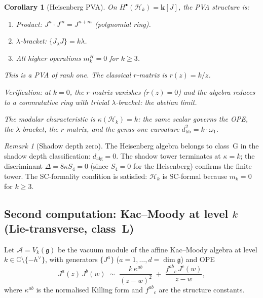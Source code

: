 \documentclass[11pt,reqno]{amsart}
\newtheorem{corollary}[theorem]{Corollary}
\theoremstyle{definition}
\theoremstyle{remark}
\newtheorem{remark}[theorem]{Remark}
\newcommand{\cA}{\mathcal{A}}
\newcommand{\cH}{\mathcal{H}}
\newcommand{\CC}{\mathbb{C}}
\providecommand{\Bbbk}{\mathbf{k}}
\newcommand{\fg}{\mathfrak{g}}
\numberwithin{equation}{section}
\begin{document}
\begin{corollary}[Heisenberg PVA]
\label{cor:heisenberg-pva}
On $H^\bullet(\cH_k) = \Bbbk[J]$, the PVA structure is:
\begin{enumerate}[label=(\roman*)]
\item Product: $J^n \cdot J^m = J^{n+m}$ (polynomial ring).
\item $\lambda$-bracket: $\{J_\lambda J\} = k\lambda$.
\item All higher operations $m_k^H = 0$ for $k \geq 3$.
\end{enumerate}
This is a PVA of rank one.  The classical $r$-matrix is
$r(z) = k/z$.

Verification: at $k = 0$, the $r$-matrix vanishes ($r(z) = 0$)
and the algebra reduces to a commutative ring with trivial
$\lambda$-bracket: the abelian limit.

The modular characteristic is $\kappa(\cH_k) = k$: the same
scalar governs the OPE, the $\lambda$-bracket, the $r$-matrix,
and the genus-one curvature $d_{\mathrm{fib}}^2 = k \cdot \omega_1$.
\end{corollary}

\begin{remark}[Shadow depth zero]
\label{rem:heisenberg-shadow}
The Heisenberg algebra belongs to class~G in the shadow depth
classification: $d_{\mathrm{alg}} = 0$.  The shadow tower
terminates at $\kappa = k$; the discriminant
$\Delta = 8\kappa S_4 = 0$ (since $S_4 = 0$ for the Heisenberg)
confirms the finite tower.  The SC-formality condition is
satisfied: $\cH_k$ is SC-formal because $m_k = 0$ for $k \geq 3$.
\end{remark}


\subsection{Second computation: Kac--Moody at level $k$
  (Lie-transverse, class~L)}
\label{subsec:comp-km}

Let $\cA = V_k(\fg)$ be the vacuum module of the affine
Kac--Moody algebra at level
$k \in \CC \setminus \{-h^\vee\}$, with generators $\{J^a\}$
($a = 1, \ldots, d = \dim\fg$) and OPE
\begin{equation}\label{eq:km-ope}
  J^a(z)\, J^b(w)
  \;\sim\;
  \frac{k\, \kappa^{ab}}{(z-w)^2}
  \;+\;
  \frac{f^{ab}{}_{c}\, J^c(w)}{z-w},
\end{equation}
where $\kappa^{ab}$ is the normalised Killing form and
$f^{ab}{}_c$ are the structure constants.
\end{document}
